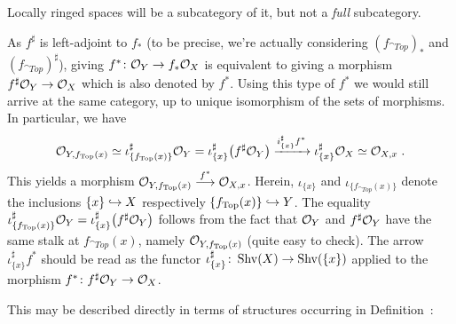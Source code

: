 \documentclass[a4paper,parskip=half,numbers=enddot, DIV=12]{scrreprt}
\begin{document}
\begin{rem*}
    Locally ringed spaces will be a subcategory of it, but not a \emph{full} subcategory.
\end{rem*}
\begin{rem*}
    As $f^\sharp$ is left-adjoint to $f_*$ (to be precise, we're actually considering  $(f_{\cat{Top}})_*$ and $(f_{\cat{Top}})^\sharp$), giving $f^*\colon \mathcal{O}_Y\to f_*\mathcal{O}_X$ is equivalent to giving a morphism $f^\sharp \mathcal{O}_Y \to \mathcal{O}_X$ which is also denoted by $f^*$. Using this type of $f^*$ we would still arrive at the same category, up to unique isomorphism of the sets of morphisms. In particular, we have 
    \begin{align*}
    	\mathcal{O}_{Y,f_{\operatorname{Top}}(x)} \simeq \iota_{\{f_{\operatorname{Top}}(x)\}}^\sharp \mathcal{O}_Y = \iota_{\{x\}}^\sharp \big(f^\sharp \mathcal{O}_Y\big)  \xrightarrow{i^\sharp_{\{x\}}f^*} \iota^\sharp_{\{x\}} \mathcal{O}_X \simeq \mathcal{O}_{X,x}\;. 
    \end{align*}
    This yields a morphism $\Oo_{Y,f_{\cat{Top}}(x)} \morphism[f^*] \Oo_{X,x}$. Herein, $\iota_{\{x\}}$ and $\iota_{\{f_{\cat{Top}}(x)\}}$ denote the inclusions $\{x\}\monomorphism X$ respectively $\{f_{\cat{Top}}(x)\}\monomorphism Y$. The equality $\iota_{\{f_{\operatorname{Top}}(x)\}}^\sharp \mathcal{O}_Y = \iota_{\{x\}}^\sharp \big(f^\sharp \mathcal{O}_Y\big)$ follows from the fact that $\mathcal{O}_Y$ and $f^\sharp\mathcal{O}_Y$ have the same stalk at $f_{\cat{Top}}(x)$, namely $\mathcal{O}_{Y,f_{\operatorname{Top}}(x)}$ (quite easy to check). The arrow $\iota_{\{x\}}^\sharp f^*$ should be read as the functor $\iota_{\{x\}}^\sharp\colon\cat{Shv}(X)\morphism\cat{Shv}(\{x\})$ applied to the morphism $f^*\colon f^\sharp\Oo_Y\morphism\Oo_X$.
    
    This may be described directly in terms of structures occurring in Definition~:
\end{rem*}
\end{document}
